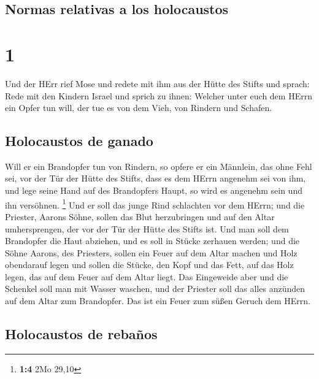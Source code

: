 \hypertarget{normas-relativas-a-los-holocaustos}{%
\subsection{Normas relativas a los
holocaustos}\label{normas-relativas-a-los-holocaustos}}

\hypertarget{section}{%
\section{1}\label{section}}

 Und der HErr rief Mose und redete mit ihm aus der Hütte
des Stifts und sprach:  Rede mit den Kindern Israel und
sprich zu ihnen: Welcher unter euch dem HErrn ein Opfer tun will, der
tue es von dem Vieh, von Rindern und Schafen.

\hypertarget{holocaustos-de-ganado}{%
\subsection{Holocaustos de ganado}\label{holocaustos-de-ganado}}

 Will er ein Brandopfer tun von Rindern, so opfere er ein
Männlein, das ohne Fehl sei, vor der Tür der Hütte des Stifts, dass es
dem HErrn angenehm sei von ihm,  und lege seine Hand auf
des Brandopfers Haupt, so wird es angenehm sein und ihn versöhnen.
\footnote{\textbf{1:4} 2Mo 29,10}  Und er soll das junge
Rind schlachten vor dem HErrn; und die Priester, Aarons Söhne, sollen
das Blut herzubringen und auf den Altar umhersprengen, der vor der Tür
der Hütte des Stifts ist.  Und man soll dem Brandopfer die
Haut abziehen, und es soll in Stücke zerhauen werden;  und
die Söhne Aarons, des Priesters, sollen ein Feuer auf dem Altar machen
und Holz obendarauf legen  und sollen die Stücke, den Kopf
und das Fett, auf das Holz legen, das auf dem Feuer auf dem Altar liegt.
 Das Eingeweide aber und die Schenkel soll man mit Wasser
waschen, und der Priester soll das alles anzünden auf dem Altar zum
Brandopfer. Das ist ein Feuer zum süßen Geruch dem HErrn.

\hypertarget{holocaustos-de-rebauxf1os}{%
\subsection{Holocaustos de rebaños}\label{holocaustos-de-rebauxf1os}}

